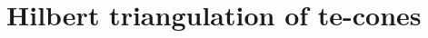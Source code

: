 \documentclass[11pt,a4paper]{amsart}
\renewcommand*{\leq}{\leqslant}
\theoremstyle{plain}
\theoremstyle{definition}
\newtheorem{conjecture}[theorem]{Conjecture}%
\newcommand{\cal}[1]{\mathcal{#1}}
\newcommand{\R}{\mathbb{R}}
\renewcommand{\cal}[1]{\mathcal{#1}}
\begin{document}
	
	
	\section{Hilbert triangulation of te-cones}\label{section:main_cones}
	
	
	
\end{document}
